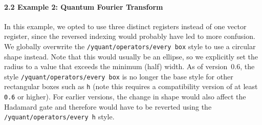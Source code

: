 \documentclass{scrartcl}
\makeatletter
\newenvironment{codeexample*}{%
   \VerbatimEnvironment%
   \let\FVB@VerbatimOut\minted@FVB@VerbatimOut
   \let\FVE@VerbatimOut\minted@FVE@VerbatimOut
   \minted@configlang{tex}%
   \minted@fvset
   \begin{VerbatimOut}[codes={\catcode`\^^I=12},firstline,lastline]{\minted@jobname.pyg}%
}{
   \end{VerbatimOut}%
   \minted@langlinenoson%
   \begin{adjustbox}{center}
       \minted@jobname.pyg %
   \end{adjustbox}\nopagebreak
   \expandafter\minted@pygmentize\expandafter{\minted@lang}%
   \minted@langlinenosoff%
   \par%
}
\def\ttlink{\link\texttt}
\makeatother
\begin{document}
            \paragraph{2.2 Example 2: Quantum Fourier Transform}\leavevmode
               \begin{example}
                  \begin{codeexample*}
                  \end{codeexample*}
                  In this example, we opted to use three distinct registers instead of one vector register, since the reversed indexing would probably have led to more confusion.
                  We globally overwrite the \ttlink{/yquant/operators/every box} style to use a circular shape instead.
                  Note that this would usually be an ellipse, so we explicitly set the radius to a value that exceeds the minimum (half) width.
                  As of version~0.6, the style \ttlink{/yquant/operators/every box} is no longer the base style for other rectangular boxes such as \ttlink{h} (note this requires a compatibility version of at least \texttt{0.6} or higher).
                  For earlier versions, the change in shape would also affect the Hadamard gate and therefore would have to be reverted using the \ttlink{/yquant/operators/every h} style.
               \end{example}

            \clearpage
\end{document}
